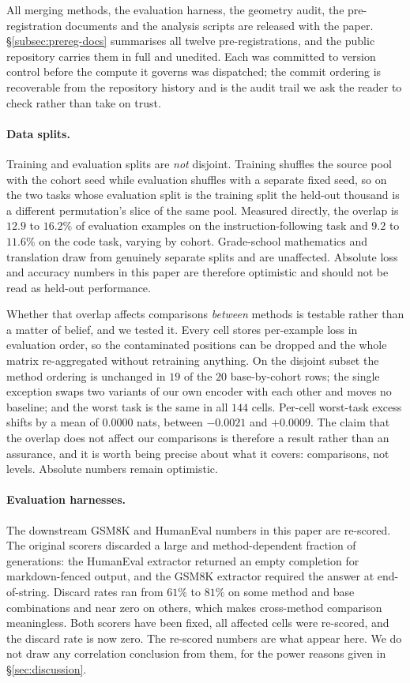 All merging methods, the evaluation harness, the geometry audit, the
pre-registration documents and the analysis scripts are released with the
paper. \S\ref{subsec:prereg-docs} summarises all twelve pre-registrations, and
the public repository carries them in full and unedited. Each was committed to version control
before the compute it governs was dispatched; the commit ordering is
recoverable from the repository history and is the audit trail we ask the
reader to check rather than take on trust.

\paragraph{Data splits.} Training and evaluation splits are \emph{not}
disjoint.
Training shuffles the source pool with the cohort seed while evaluation
shuffles with a separate fixed seed, so on the two tasks whose evaluation
split is the training split the held-out thousand is a different
permutation's slice of the same pool. Measured directly, the overlap is
$12.9$ to $16.2\%$ of evaluation examples on the instruction-following
task and $9.2$ to $11.6\%$ on the code task, varying by cohort. Grade-school
mathematics and translation draw from genuinely separate splits and are
unaffected. Absolute loss and accuracy numbers in this paper are therefore
optimistic and should not be read as held-out performance.

Whether that overlap affects comparisons \emph{between} methods is
testable rather than a matter of belief, and we tested it.
Every cell stores per-example loss in evaluation order, so the
contaminated positions can be dropped and the whole matrix re-aggregated
without retraining anything. On the disjoint subset the method ordering is
unchanged in $19$ of the $20$ base-by-cohort rows; the single exception
swaps two variants of our own encoder with each other and moves no
baseline; and the worst task is the same in all $144$ cells. Per-cell
worst-task excess shifts by a mean of $0.0000$ nats, between $-0.0021$ and
$+0.0009$. The claim that the overlap does not affect our comparisons is
therefore a result rather than an assurance, and it is worth being precise
about what it covers: comparisons, not levels. Absolute numbers remain
optimistic.

\paragraph{Evaluation harnesses.} The downstream GSM8K and HumanEval
numbers in this paper are re-scored. The original scorers discarded
a large and method-dependent fraction of generations: the HumanEval
extractor returned an empty completion for markdown-fenced output, and the
GSM8K extractor required the answer at end-of-string. Discard rates ran
from $61\%$ to $81\%$ on some method and base combinations and near zero
on others, which makes cross-method comparison meaningless. Both scorers
have been fixed, all affected cells were re-scored, and the discard rate
is now zero. The re-scored numbers are what appear here. We do not draw
any correlation conclusion from them, for the power reasons given in
\S\ref{sec:discussion}.

